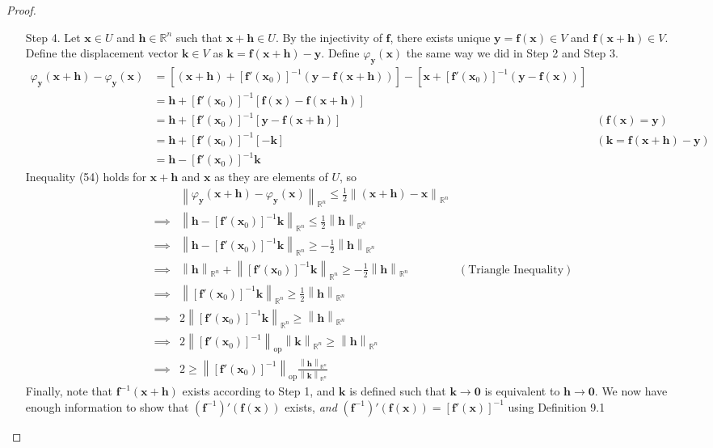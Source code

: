 \documentclass{article}
\newcommand{\R}{\mathbb{R}}
\newcommand{\x}{\mathbf{x}}
\newcommand{\f}{\mathbf{f}}
\newcommand{\y}{\mathbf{y}}
\newcommand{\h}{\mathbf{h}}
\newcommand{\ze}{\mathbf{0}}
\newcommand{\norm}[1]{\left\lVert#1\right\rVert}
\newcommand{\normop}[1]{\left\lVert#1\right\rVert_\text{op}}
\theoremstyle{definition}
\begin{document}
\begin{proof}
\begin{enumerate}
			\item [Step 4.] Let $ \x \in U $ and $ \h\in\R^n  $ such that $ \x+\h \in U $. By the injectivity of $ \f $, there exists unique $ \y = \f(\x)\in V $ and $ \f(\x+\mathbf h) \in V $. Define the displacement vector $ \mathbf k\in V $ as $ \mathbf k = \f(\x+\mathbf h) - \y $. Define $ \varphi_\y(\x) $ the same way we did in Step 2 and Step 3.  
			\begin{align*}
				\varphi_\y(\x+\h) - \varphi_\y(\x) & = \left[(\x+\h) + \left[\f'(\x_0)\right]^{-1}(\y-\f(\x+\h))\right] - \left[\x + \left[\f'(\x_0)\right]^{-1}(\y-\f(\x))\right] \\ 
				& = \h + \left[\f'(\x_0)\right]^{-1}\left[\f(\x) - \f(\x + \h) \right] \\ 
				& = \h + \left[\f'(\x_0)\right]^{-1}\left[\y - \f(\x + \h) \right] & (\f(\x) = \y)\\
				& = \h + \left[\f'(\x_0)\right]^{-1}[-\mathbf k]  & (\mathbf k =\f(\x+\mathbf h) -\y)\\
				& = \h - \left[\f'(\x_0)\right]^{-1}\mathbf k
			\end{align*}
			Inequality (54) holds for $ \x+\h $ and $ \x $ as they are elements of $ U $, so 
			\begin{align}
				&\norm{	\varphi_\y(\x+\h) - \varphi_\y(\x) }_{\R^n}\le \frac{1}{2}\norm{(\x+\h) - \x}_{\R^n}\nonumber\\
				\implies& \norm{\h - \left[\f'(\x_0)\right]^{-1}\mathbf k }_{\R^n} \le \frac{1}{2}\norm{\h}_{\R^n} \nonumber\\
				\implies & \norm{\h - \left[\f'(\x_0)\right]^{-1}\mathbf k }_{\R^n} \ge -\frac{1}{2}\norm{\h}_{\R^n}\nonumber\\\implies & \norm{\h}_{\R^n} + \norm{\left[\f'(\x_0)\right]^{-1}\mathbf k }_{\R^n} \ge -\frac{1}{2}\norm{\h}_{\R^n} & (\text{Triangle Inequality})\nonumber\\
				\implies &\norm{\left[\f'(\x_0)\right]^{-1}\mathbf k }_{\R^n} \ge \frac{1}{2}\norm{\h}_{\R^n} \nonumber\\
				\implies &2\norm{\left[\f'(\x_0)\right]^{-1}\mathbf k }_{\R^n} \ge \norm{\h}_{\R^n} \nonumber \\ 
				\implies &2\normop{\left[\f'(\x_0)\right]^{-1}} \norm{\mathbf k }_{\R^n}\ge \norm{\h}_{\R^n} \nonumber
				\\ 
				\implies &2\ge \normop{\left[\f'(\x_0)\right]^{-1}}\frac{\norm{\mathbf h}_{\R^n}}{\norm{\mathbf k}_{\R^n}}
			\end{align}
			Finally, note that $ \f^{-1}(\x+\h) $ exists according to Step 1, and $ \mathbf k $ is defined such that $ \mathbf k\to\ze  $ is equivalent to $ \mathbf h\to \ze $. We now have enough information to show that $(\f^{-1})'(\f(\x))$ exists, \textit{and} $(\f^{-1})'(\f(\x))= [\f'(\x)]^{-1}$ using Definition 9.1 

\end{enumerate}
\end{proof}
\end{document}
